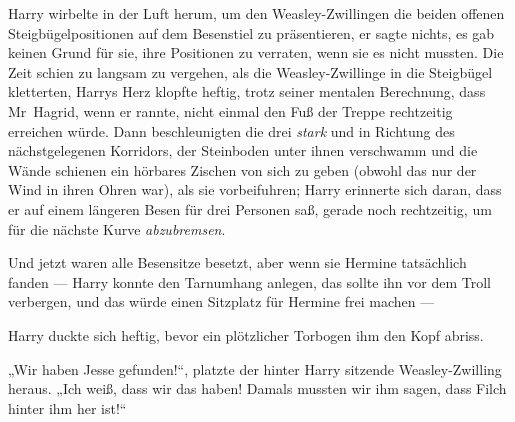 Harry wirbelte in der Luft herum, um den Weasley-Zwillingen die beiden offenen Steigbügelpositionen auf dem Besenstiel zu präsentieren, er sagte nichts, es gab keinen Grund für sie, ihre Positionen zu verraten, wenn sie es nicht mussten. Die Zeit schien zu langsam zu vergehen, als die Weasley-Zwillinge in die Steigbügel kletterten, Harrys Herz klopfte heftig, trotz seiner mentalen Berechnung, dass Mr~Hagrid, wenn er rannte, nicht einmal den Fuß der Treppe rechtzeitig erreichen würde. Dann beschleunigten die drei \emph{stark} und in Richtung des nächstgelegenen Korridors, der Steinboden unter ihnen verschwamm und die Wände schienen ein hörbares Zischen von sich zu geben (obwohl das nur der Wind in ihren Ohren war), als sie vorbeifuhren; Harry erinnerte sich daran, dass er auf einem längeren Besen für drei Personen saß, gerade noch rechtzeitig, um für die nächste Kurve \emph{abzubremsen}.

Und jetzt waren alle Besensitze besetzt, aber wenn sie Hermine tatsächlich fanden — Harry konnte den Tarnumhang anlegen, das sollte ihn vor dem Troll verbergen, und das würde einen Sitzplatz für Hermine frei machen —

Harry duckte sich heftig, bevor ein plötzlicher Torbogen ihm den Kopf abriss.

„Wir haben Jesse gefunden!“, platzte der hinter Harry sitzende Weasley-Zwilling heraus.
„Ich weiß, dass wir das haben! Damals mussten wir ihm sagen, dass Filch hinter ihm her ist!“

